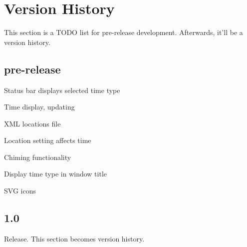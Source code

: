 \section{Version History}

This section is a TODO list for pre-release development. Afterwards, it'll be a version history.

\subsection{pre-release}

Status bar displays selected time type

Time display, updating

XML locations file

Location setting affects time

Chiming functionality

Display time type in window title

SVG icons

\subsection{1.0}

Release. This section becomes version history.

